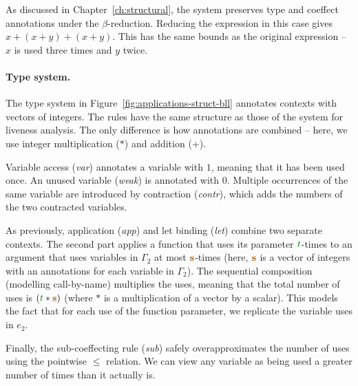 As discussed in Chapter~\ref{ch:structural}, the system preserves type and coeffect annotations under
the $\beta$-reduction. Reducing the expression in this case gives $x + (x+y) + (x+y)$. This has the 
same bounds as the original expression -- $x$ is used three times and $y$ twice.

\paragraph{Type system.}
The type system in Figure~\ref{fig:applications-struct-bll} annotates contexts with vectors of integers.
The rules have the same structure as those of the system for liveness analysis. The only difference is
how annotations are combined -- here, we use integer multiplication ($\ast$) and addition ($+$).

Variable access (\emph{var}) annotates a variable with $1$, meaning that it has been used once. An
unused variable (\emph{weak}) is annotated with $0$. Multiple occurrences of the same variable are 
introduced by contraction (\emph{contr}), which adds the numbers of the two contracted variables.

As previously, application (\emph{app}) and let binding (\emph{let}) combine two separate contexts.
The second part applies a function that uses its parameter $\cclrd{t}$-times to an argument that uses
variables in $\Gamma_2$ at most $\aclrd{\mathbf{s}}$-times (here, $\aclrd{\mathbf{s}}$ is a vector of
integers with an annotations for each variable in $\Gamma_2$). The sequential composition (modelling
call-by-name) multiplies the uses, meaning that the total number of uses is $(\cclrd{t} \ast \aclrd{\mathbf{s}})$
(where $\ast$ is a multiplication of a vector by a scalar). This models the fact that for each use of
the function parameter, we replicate the variable uses in $e_2$.

Finally, the sub-coeffecting rule (\emph{sub}) safely overapproximates
the number of uses using the pointwise
$\leq$ relation. We can view any variable as being used a greater
number of times than it actually is.

